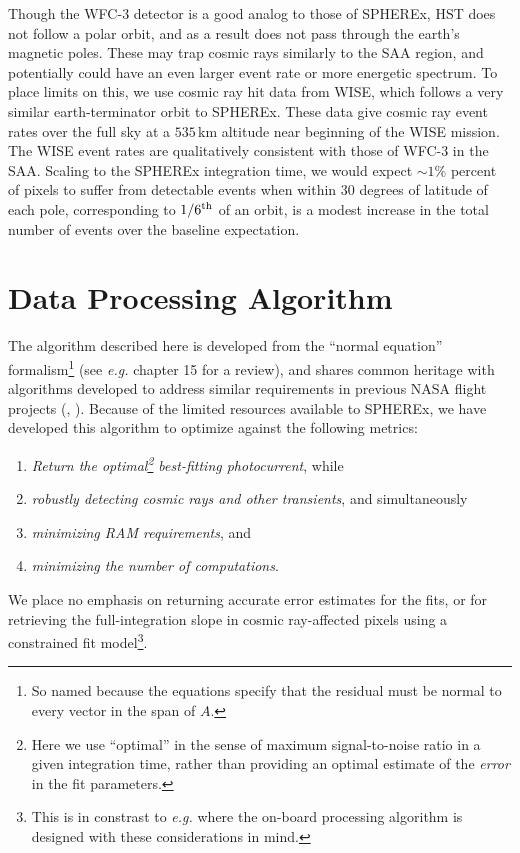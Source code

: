\documentclass{ws-jai}
\begin{document}
Though the WFC-3 detector is a good analog to those of SPHEREx, HST
does not follow a polar orbit, and as a result does not pass through
the earth's magnetic poles.  These may trap cosmic rays similarly to
the SAA region, and potentially could have an even larger event rate
or more energetic spectrum.  To place limits on this, we use cosmic
ray hit data from WISE, which follows a very similar earth-terminator
orbit to SPHEREx.  These data give cosmic ray event rates over the
full sky at a $535 \,$km altitude near beginning of the WISE
mission.  The WISE event rates are qualitatively consistent with those
of WFC-3 in the SAA.  Scaling to the SPHEREx integration time, we
would expect $\sim 1 \%$ percent of pixels to suffer from detectable
events when within 30 degrees of latitude of each pole, corresponding
to $1/6^{\rm th}$ of an orbit, is a modest increase in the total
number of events over the baseline expectation.

\section{Data Processing Algorithm}
\label{S:dataprocessing}

The algorithm described here is developed from the ``normal equation''
formalism\footnote{So named because the equations
  specify that the residual must be normal to every vector in the span
  of $A$.} (see \textit{e.g.} \citealt{Press1992} chapter 15 for a review), and
shares common heritage with algorithms developed to address similar
requirements in previous NASA flight projects (\citealt{Fixsen2000},
\citealt{Offenberg2005}).  Because of the limited resources available
to SPHEREx, we have developed this algorithm to optimize against the
following metrics:
%
\begin{enumerate}
\item \textit{Return the optimal\footnote{Here we use ``optimal'' in
      the sense of maximum signal-to-noise ratio in a given
      integration time, rather than providing an optimal estimate of
      the \emph{error} in the fit parameters.} best-fitting
    photocurrent}, while
\item \textit{robustly detecting cosmic rays and other transients}, and
  simultaneously 
\item \textit{minimizing RAM requirements}, and
\item \textit{minimizing the number of computations}.
\end{enumerate}
%
We place no emphasis on returning accurate error estimates for the
fits, or for retrieving the full-integration slope in cosmic ray-affected
pixels using a constrained fit model\footnote{This is in constrast to
  \textit{e.g.} \citet{Offenberg2005} where the on-board processing
  algorithm is designed with these considerations in mind.}.
\end{document}
